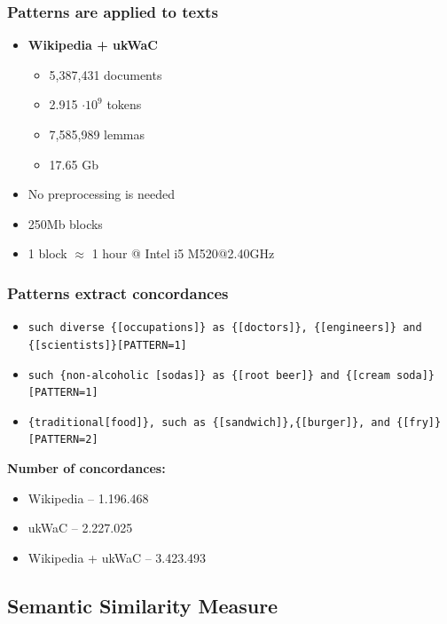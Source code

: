 \documentclass{beamer}
\begin{document}
\begin{frame}
\frametitle{Patterns are applied to texts}



\begin{itemize}
  \item \textbf{Wikipedia + ukWaC} 
  \begin{itemize}
    \item 5,387,431 documents
    \item 2.915 $\cdot 10^9$ tokens
    \item 7,585,989 lemmas
    \item 17.65 Gb
  \end{itemize}
	  \item No preprocessing is needed
	  \item 250Mb blocks 
	  \item 1 block $\approx$ 1 hour @ Intel i5 M520@2.40GHz
	  	
\end{itemize}
\end{frame}


\begin{frame}
\frametitle{Patterns extract concordances}

\begin{itemize}
  \item \texttt{such diverse \{[occupations]\} as
  \{[doctors]\}, \{[engineers]\} and \{[scientists]\}[PATTERN=1]}
  \item \texttt{such \{non-alcoholic [sodas]\} as \{[root beer]\} and \{[cream soda]\}[PATTERN=1]}
  \item \texttt{\{traditional[food]\}, such as \{[sandwich]\},\{[burger]\}, and \{[fry]\}[PATTERN=2]}
\end{itemize}

\textbf{Number of concordances:}

\begin{itemize}
  \item Wikipedia -- 1.196.468 
  \item ukWaC -- 2.227.025 
  \item Wikipedia + ukWaC -- 3.423.493
\end{itemize}


\end{frame}

\subsection{Semantic Similarity Measure}
\end{document}
